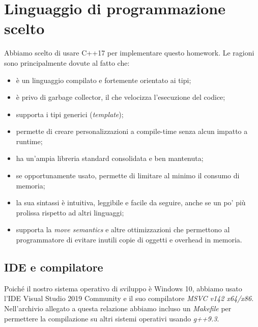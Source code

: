 \section{Linguaggio di programmazione scelto}
\label{cap:language-choice}

Abbiamo scelto di usare C++17 per implementare questo homework. Le ragioni sono principalmente dovute al fatto che:

\begin{itemize}
    \item è un linguaggio compilato e fortemente orientato ai tipi;
    \item è privo di garbage collector, il che velocizza l'esecuzione del codice;
    \item supporta i tipi generici (\textit{template});
    \item permette di creare personalizzazioni a compile-time senza alcun impatto a runtime;
    \item ha un'ampia libreria standard consolidata e ben mantenuta;
    \item se opportunamente usato, permette di limitare al minimo il consumo di memoria;
    \item la sua sintassi è intuitiva, leggibile e facile da seguire, anche se un po' più prolissa rispetto ad altri linguaggi;
    \item supporta la \textit{move semantics} e altre ottimizzazioni che permettono al programmatore di evitare inutili copie di oggetti e overhead in memoria.
\end{itemize}

\subsection{IDE e compilatore}

Poiché il nostro sistema operativo di sviluppo è Windows 10, abbiamo usato l'IDE Visual Studio 2019 Community e il suo compilatore \textit{MSVC v142 x64/x86}. \\

\noindent Nell'archivio allegato a questa relazione abbiamo incluso un \textit{Makefile} per permettere la compilazione su altri sistemi operativi usando \textit{g++9.3}.
